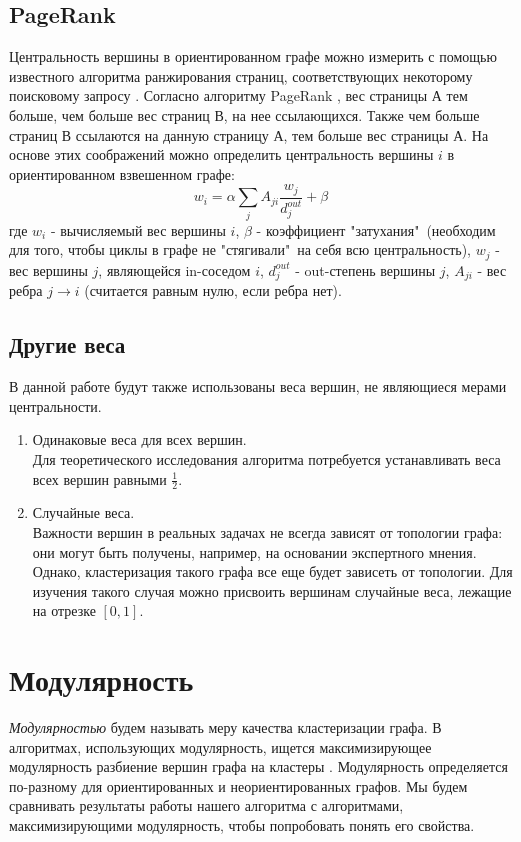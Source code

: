 	\subsection{PageRank}
	Центральность вершины в ориентированном графе можно измерить с помощью известного алгоритма ранжирования страниц, соответствующих некоторому поисковому запросу \cite{pagerankcent}. Согласно алгоритму PageRank \cite{pagerank}, вес страницы А тем больше, чем больше вес страниц В, на нее ссылающихся. Также чем больше страниц В ссылаются на данную страницу А, тем больше вес страницы А. На основе этих соображений можно определить центральность вершины $i$ в ориентированном взвешенном графе:
	\begin{equation}
	w_i = \alpha \sum_j A_{ji} \frac{w_j}{d_j^{out}}+\beta
	\end{equation}
	где $w_i$ - вычисляемый вес вершины $i$, $\beta$ - коэффициент "затухания"\ (необходим для того, чтобы циклы в графе не "стягивали"\ на себя всю центральность), $w_j$ - вес вершины $j$, являющейся in-соседом $i$, $d_j^{out}$ - out-степень вершины $j$, $A_{ji}$ - вес ребра $j\rightarrow i$ (считается равным нулю, если ребра нет).
	
	\subsection{Другие веса}
	В данной работе будут также использованы веса вершин, не являющиеся мерами центральности.
	
	\begin{enumerate}
		\item Одинаковые веса для всех вершин.\\
		Для теоретического исследования алгоритма потребуется устанавливать веса всех вершин равными $\frac{1}{2}$.
		
		\item Случайные веса.\\
		Важности вершин в реальных задачах не всегда зависят от топологии графа: они могут быть получены, например, на основании экспертного мнения. Однако, кластеризация такого графа все еще будет зависеть от топологии. Для изучения такого случая можно присвоить вершинам случайные веса, лежащие на отрезке $[0,1]$.
	\end{enumerate}

\section{Модулярность}
\textit{Модулярностью} будем называть меру качества кластеризации графа. В алгоритмах, использующих модулярность, ищется максимизирующее модулярность разбиение вершин графа на кластеры \cite{modularity}. Модулярность определяется по-разному для ориентированных и неориентированных графов. Мы будем сравнивать результаты работы нашего алгоритма с алгоритмами, максимизирующими модулярность, чтобы попробовать понять его свойства.\\

